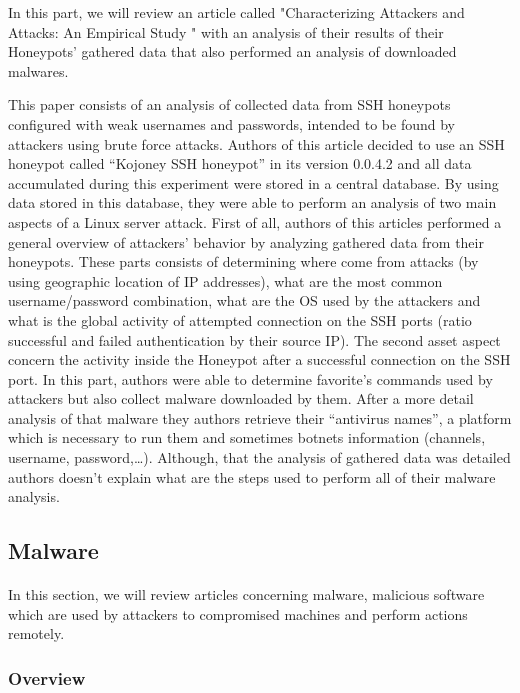 In this part, we will review an article called "Characterizing Attackers and Attacks: An
Empirical Study " with an analysis of their results of their Honeypots’
gathered data that also performed an analysis of downloaded malwares.

This paper consists of an analysis of collected data from SSH honeypots configured with weak
usernames and passwords, intended to be found by attackers using brute force attacks.
Authors of this article decided to use an SSH honeypot called “Kojoney SSH honeypot” in its
version 0.0.4.2 and all data accumulated during this experiment were stored in a central
database.
By using data stored in this database, they were able to perform an analysis of two main
aspects of a Linux server attack. First of all, authors of this articles performed a general
overview of attackers’ behavior by analyzing gathered data from their honeypots. These parts
consists of determining where come from attacks (by using geographic location of IP addresses),
what are the most common username/password combination, what are the OS used by the attackers
and what is the global activity of attempted connection on the SSH ports (ratio successful
and failed authentication by their source IP). The second asset aspect concern the activity
inside the Honeypot after a successful connection on the SSH port. In this part, authors were
able to determine favorite’s commands used by attackers but also collect malware downloaded
by them. After a more detail analysis of that malware they authors retrieve their
“antivirus names”, a platform which is necessary to run them and sometimes botnets information
(channels, username, password,…).
Although, that the analysis of gathered data was detailed authors doesn’t explain what are
the steps used to perform all of their malware analysis.

\subsection{Malware} %

\paragraph{}

In this section, we will review articles concerning malware, malicious software which are
used by attackers to compromised machines and perform actions remotely.

\subsubsection{Overview} %

